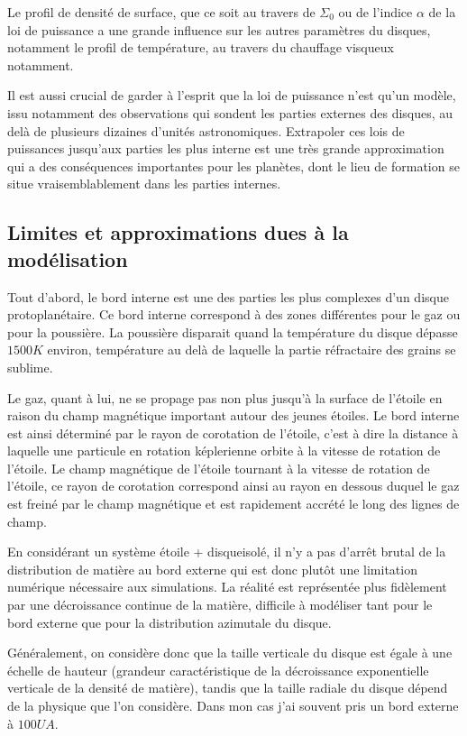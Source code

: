 Le profil de densité de surface, que ce soit au travers de $\Sigma_0$ ou de l'indice $\alpha$ de la loi de puissance a une grande influence sur les autres paramètres du disques, notamment le profil de température, au travers du chauffage visqueux notamment. 

Il est aussi crucial de garder à l'esprit que la loi de puissance n'est qu'un modèle, issu notamment des observations qui sondent les parties externes des disques, au delà de plusieurs dizaines d'unités astronomiques. Extrapoler ces lois de puissances jusqu'aux parties les plus interne est une très grande approximation qui a des conséquences importantes pour les planètes, dont le lieu de formation se situe vraisemblablement dans les parties internes.

\subsection{Limites et approximations dues à la modélisation}
Tout d'abord, le bord interne est une des parties les plus complexes d'un disque protoplanétaire. Ce bord interne correspond à des zones différentes pour le gaz ou pour la poussière. La poussière disparait quand la température du disque dépasse $1500\unit{K}$ environ, température au delà de laquelle la partie réfractaire des grains se sublime. 

Le gaz, quant à lui, ne se propage pas non plus jusqu'à la surface de l'étoile en raison du champ magnétique important autour des jeunes étoiles. Le bord interne est ainsi déterminé par le rayon de corotation de l'étoile, c'est à dire la distance à laquelle une particule en rotation képlerienne orbite à la vitesse de rotation de l'étoile. Le champ magnétique de l'étoile tournant à la vitesse de rotation de l'étoile, ce rayon de corotation correspond ainsi au rayon en dessous duquel le gaz est freiné par le champ magnétique et est rapidement accrété le long des lignes de champ. 

\bigskip

En considérant un système \og étoile + disque\fg isolé, il n'y a pas d'arrêt brutal de la distribution de matière au bord externe qui est donc plutôt une limitation numérique nécessaire aux simulations. La réalité est représentée plus fidèlement par une décroissance continue de la matière, difficile à modéliser tant pour le bord externe que pour la distribution azimutale du disque. 

Généralement, on considère donc que la taille verticale du disque est égale à une échelle de hauteur (grandeur caractéristique de la décroissance exponentielle verticale de la densité de matière), tandis que la taille radiale du disque dépend de la physique que l'on considère. Dans mon cas j'ai souvent pris un bord externe à $100\unit{UA}$.

